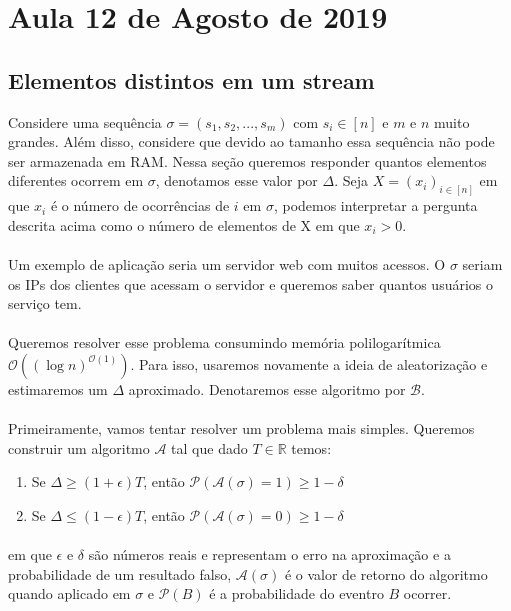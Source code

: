 \section{Aula 12 de Agosto de 2019}
\label{2019_08_12}
\subsection{Elementos distintos em um stream}
Considere uma sequência $\sigma = (s_1, s_2, ..., s_m)$ com $s_i \in [n]$ e $m$ e $n$ muito grandes. Além disso, considere que devido ao tamanho essa sequência não pode ser armazenada em RAM. Nessa seção queremos responder quantos elementos diferentes ocorrem em $\sigma$, denotamos esse valor por $\Delta$. Seja $X = (x_i)_{i \in [n]}$ em que $x_i$ é o número de ocorrências de $i$ em $\sigma$, podemos interpretar a pergunta descrita acima como o número de elementos de X em que $x_i>0$.
\paragraph{}Um exemplo de aplicação seria um servidor web com muitos acessos. O $\sigma$ seriam os IPs dos clientes que acessam o servidor e queremos saber quantos usuários o serviço tem.
\paragraph{} Queremos resolver esse problema consumindo memória polilogarítmica $\mathcal{O}((\log{}n)^{\mathcal{O}(1)})$. Para isso, usaremos novamente a ideia de aleatorização e estimaremos um $\Delta$ aproximado. Denotaremos esse algoritmo por $\mathcal{B}$.
\paragraph{}Primeiramente, vamos tentar resolver um problema mais simples. Queremos construir um algoritmo $\mathcal{A}$ tal que dado $T \in \mathbb{R}$ temos:
\begin{enumerate}
    \centering
    \item Se $\Delta \geq (1+\epsilon)T$, então $\mathcal{P}(\mathcal{A}(\sigma) = 1) \geq 1 - \delta$
    \item Se $\Delta \leq (1-\epsilon)T$, então $\mathcal{P}(\mathcal{A}(\sigma) = 0) \geq 1 - \delta$
\end{enumerate}
\paragraph{} em que $\epsilon$ e $\delta$ são números reais e representam o erro na aproximação e a probabilidade de um resultado falso, $\mathcal{A}(\sigma)$ é o valor de retorno do algoritmo quando aplicado em $\sigma$ e $\mathcal{P}(B)$ é a probabilidade do eventro $B$ ocorrer.
